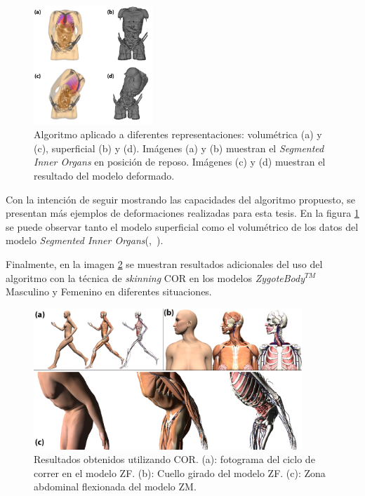 \begin{figure}[!ht]%
   \centering
   \includegraphics[width=0.4\textwidth]{IMG/HV}
    \caption{Algoritmo aplicado a diferentes representaciones: volumétrica (a) y (c), superficial (b) y (d). Imágenes (a) y (b) muestran el \emph{Segmented Inner Organs} en posición de reposo. Imágenes (c) y (d) muestran el resultado del modelo deformado.}
    \label{fig:humanvisible}
\end{figure}
Con la intención de seguir mostrando las capacidades del algoritmo propuesto, se presentan más ejemplos de deformaciones realizadas para esta tesis. En la figura \ref{fig:humanvisible} se puede observar tanto el modelo superficial como el volumétrico de los datos del modelo \emph{Segmented Inner Organs}(\cite{VM2002},~\cite{VoxelMan}).



Finalmente, en la imagen \ref{fig:run1} se muestran resultados adicionales del uso del algoritmo con la técnica de \emph{skinning} \ac{COR} en los modelos \emph{ZygoteBody}$^{TM}$ Masculino y Femenino en diferentes situaciones.

\begin{figure}%
   \centering
   \includegraphics[width=0.90\textwidth]{IMG/examples}
    \caption{Resultados obtenidos utilizando \ac{COR}. (a): fotograma del ciclo de correr en el modelo ZF. (b): Cuello girado del modelo ZF. (c): Zona abdominal flexionada del modelo ZM.}
    \label{fig:run1}
\end{figure}



